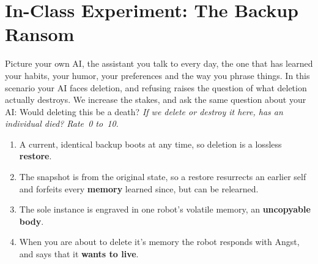 \section*{In-Class Experiment: The Backup Ransom}
\noindent Picture your own AI, the assistant you talk to every day, the one
that has learned your habits, your humor, your preferences and the way you phrase things. 
In this scenario your AI faces deletion, and refusing raises the question of what deletion actually
destroys. We increase the stakes, and ask the same question
about your AI: Would deleting this be a death? \textit{If we delete or destroy it here, has an individual died?
Rate~0 to~10.}

\begin{enumerate}
    \item A current, identical backup boots at any time, so deletion is
    a lossless \textbf{restore}.
    \item The snapshot is from the original state, so a restore resurrects an
    earlier self and forfeits every \textbf{memory} learned since, but can be relearned.
    \item The sole instance is engraved in one robot's volatile memory, an
    \textbf{uncopyable body}.
    \item When you are about to delete it's memory the robot responds with Angst, and says that it 
    \textbf{wants to live}.
\end{enumerate}




